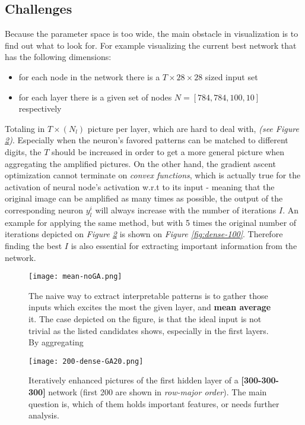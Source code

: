 \subsection{Challenges} Because the parameter space is too wide, the main obstacle in visualization is to find out what to look for. For example visualizing the current best network that has the following dimensions: 
\begin{itemize}
    \item for each node in the network there is a $T \times 28 \times 28$ sized input set
    \item for each layer there is a given set of nodes $N = [784, 784, 100, 10]$ respectively
\end{itemize}

Totaling in $T\times(N_l)$ picture per layer, which are hard to deal with, \emph{(see Figure \ref{fig:dense})}. 
Especially when the neuron's favored patterns can be matched to different digits, 
the $T$ should be increased in order to get a more general picture when aggregating the amplified pictures.
On the other hand, the gradient ascent optimization cannot terminate on \emph{convex functions}, which is actually true for the activation of neural node's activation w.r.t to its input - meaning that the original image can be amplified as many times as possible, the output of the corresponding neuron $y_l^i$ will always increase with the number of iterations $I$. An example for applying the same method, but with 5 times the original number of iterations depicted on \emph{Figure \ref{fig:dense}} is shown on \emph{Figure \ref{fig:dense-100}}.
Therefore finding the best $I$ is also essential for extracting important information from the network.


\begin{figure}
    \centering
    \texttt{[image: mean-noGA.png]}
    \caption{The naive way to extract interpretable patterns is to gather those inputs which excites the most the given layer, and \textbf{mean average} it. The case depicted on the figure, is that the ideal input is not trivial as the listed candidates shows, especially in the first layers. By aggregating}
    \label{fig:mean}
\end{figure}


\begin{figure}
    \centering
    \texttt{[image: 200-dense-GA20.png]}
    \caption{Iteratively enhanced pictures of the first hidden layer of a \textbf{[300-300-300]} network (first 200 are shown in \emph{row-major order}). The main question is, which of them holds important features, or needs further analysis.}
    \label{fig:dense}
\end{figure}


